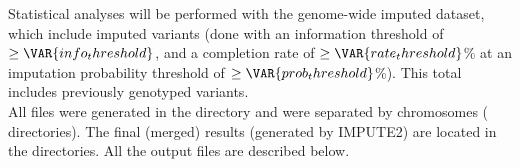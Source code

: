 
Statistical analyses will be performed with the genome-wide imputed dataset,
which include  imputed variants (done with an information
threshold of $\geq\VAR{ info_threshold }$, and a completion rate of
$\geq\VAR{ rate_threshold }$\% at an imputation probability threshold of
$\geq\VAR{ prob_threshold }$\%). This total includes 
previously genotyped variants.\\

All files were generated in the \texttt{} directory and were
separated by chromosomes (\texttt{} directories). The
final (merged) results (generated by IMPUTE2) are located in the
\texttt{} directories. All the output files are
described below.



